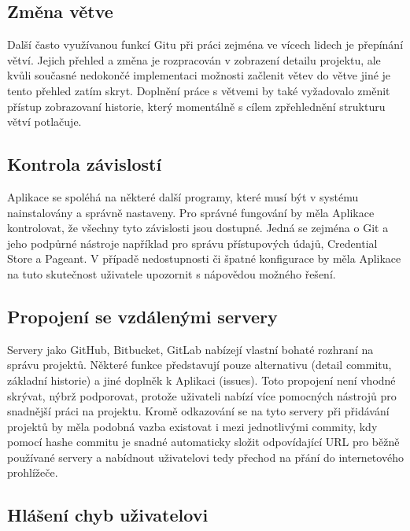 \subsection{Změna větve}

Další často využívanou funkcí Gitu při práci zejména ve vícech lidech je přepínání větví. Jejich přehled a změna je rozpracován v zobrazení detailu projektu, ale kvůli současné nedokončé implementaci možnosti začlenit větev do větve jiné je tento přehled zatím skryt. Doplnění práce s větvemi by také vyžadovalo změnit přístup zobrazovaní historie, který momentálně s cílem zpřehlednění strukturu větví potlačuje.

\subsection{Kontrola závislostí}

Aplikace se spoléhá na některé další programy, které musí být v systému nainstalovány a správně nastaveny. Pro správné fungování by měla Aplikace kontrolovat, že všechny tyto závislosti jsou dostupné. Jedná se zejména o Git a jeho podpůrné nástroje například pro správu přístupových údajů, Credential Store a Pageant. V případě nedostupnosti či špatné konfigurace by měla Aplikace na tuto skutečnost uživatele upozornit s nápovědou možného řešení.

\subsection{Propojení se vzdálenými servery}

Servery jako GitHub, Bitbucket, GitLab nabízejí vlastní bohaté rozhraní na správu projektů. Některé funkce představují pouze alternativu (detail commitu, základní historie) a jiné doplněk k Aplikaci (issues). Toto propojení není vhodné skrývat, nýbrž podporovat, protože uživateli nabízí více pomocných nástrojů pro snadnější práci na projektu. Kromě odkazování se na tyto servery při přidávání projektů by měla podobná vazba existovat i mezi jednotlivými commity, kdy pomocí hashe commitu je snadné automaticky složit odpovídající URL pro běžně používané servery a nabídnout uživatelovi tedy přechod na přání do internetového prohlížeče.

\subsection{Hlášení chyb uživatelovi}

